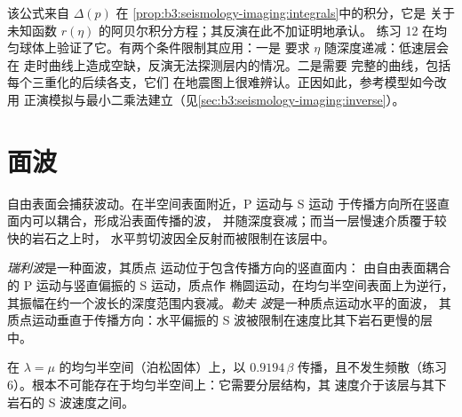 该公式来自 $\Delta(p)$ 在
 \cref{prop:b3:seismology-imaging:integrals}中的积分，它是
关于未知函数 $r(\eta)$ 的阿贝尔积分方程；其反演在此不加证明地承认。
练习 12 在均匀球体上验证了它。有两个条件限制其应用：一是
要求 $\eta$ 随深度递减：低速层会在
走时曲线上造成空缺，反演无法探测层内的情况。二是需要
完整的曲线，包括每个三重化的后续各支，它们
在地震图上很难辨认。正因如此，参考模型如今改用
正演模拟与最小二乘法建立（见\cref{sec:b3:seismology-imaging:inverse}）。

\section{面波}

自由表面会捕获波动。在半空间表面附近，P 运动与 S 运动
于传播方向所在竖直面内可以耦合，形成沿表面传播的波，
并随深度衰减；而当一层慢速介质覆于较快的岩石之上时，
水平剪切波因全反射而被限制在该层中。

\begin{definition}\label{def:b3:seismology-imaging:surface-waves}
\emph{瑞利波}是一种面波，其质点
运动位于包含传播方向的竖直面内：
由自由表面耦合的 P 运动与竖直偏振的 S 运动，质点作
椭圆运动，在均匀半空间表面上为逆行，
其振幅在约一个波长的深度范围内衰减。\emph{勒夫
波}是一种质点运动水平的面波，
其质点运动垂直于传播方向：水平偏振的 S
波被限制在速度比其下岩石更慢的层中。
\end{definition}

在 $\lambda = \mu$ 的均匀半空间（泊松固体）上，以 $0.9194\,\beta$ 传播，且不发生频散（练习 6）。根本不可能存在于均匀半空间上：它需要分层结构，其
速度介于该层与其下岩石的 S 波速度之间。

